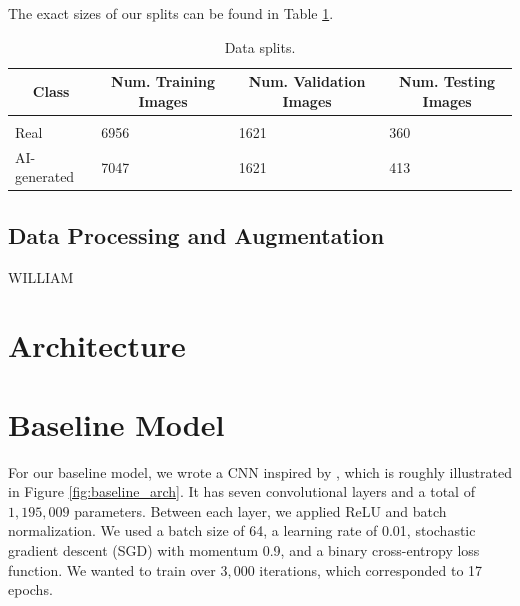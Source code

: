 \documentclass{article} %
\begin{document}
The exact sizes of our splits can be found in Table \ref{data_splits}.

\begin{table}[t]
    \caption{Data splits.}
    \label{data_splits}
    \begin{center}
        \begin{tabular}{llll}
            \multicolumn{1}{c}{\bf Class} & \multicolumn{1}{c}{\bf Num. Training Images} & \multicolumn{1}{c}{\bf Num. Validation Images} & \multicolumn{1}{c}{\bf Num. Testing Images}
            \\ \hline \\
            Real                          & 6956                                         & 1621                                           & 360                                         \\
            AI-generated                  & 7047                                         & 1621                                           & 413                                         \\
        \end{tabular}
    \end{center}
\end{table}

\subsection{Data Processing and Augmentation}

WILLIAM

\section{Architecture}



\section{Baseline Model}

For our baseline model, we wrote a CNN inspired by \citet{wang2020cnngeneratedimagessurprisinglyeasy}, which is roughly illustrated in Figure \ref{fig:baseline_arch}. It has seven convolutional layers and a total of $1,195,009$ parameters. Between each layer, we applied ReLU and batch normalization. We used a batch size of 64, a learning rate of 0.01, stochastic gradient descent (SGD) with momentum 0.9, and a binary cross-entropy loss function. We wanted to train over $3,000$ iterations, which corresponded to 17 epochs.
\end{document}
